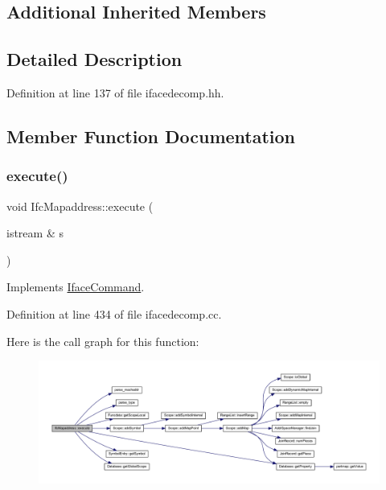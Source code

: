 \subsection*{Additional Inherited Members}


\subsection{Detailed Description}


Definition at line 137 of file ifacedecomp.\+hh.



\subsection{Member Function Documentation}
\mbox{\label{class_ifc_mapaddress_a83f33c8f34d56dfcaabe64a58f9b8236}} 
\subsubsection{\texorpdfstring{execute()}{execute()}}
{\footnotesize\ttfamily void Ifc\+Mapaddress\+::execute (\begin{DoxyParamCaption}\item[{istream \&}]{s }\end{DoxyParamCaption})\hspace{0.3cm}{\ttfamily [virtual]}}



Implements \mbox{\hyperlink{class_iface_command_af10e29cee2c8e419de6efe9e680ad201}{Iface\+Command}}.



Definition at line 434 of file ifacedecomp.\+cc.

Here is the call graph for this function\+:
\nopagebreak
\begin{figure}[H]
\begin{center}
\leavevmode
\includegraphics[width=350pt]{class_ifc_mapaddress_a83f33c8f34d56dfcaabe64a58f9b8236_cgraph}
\end{center}
\end{figure}


